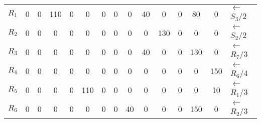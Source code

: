 \documentclass[12pt]{article}
\begin{document}
\begin{enumerate}
\begin{tabular}{|c|c|c|c|c|c|c|c|c|c|c|c|c|c|l}
$R_1$ & 0   & {\color[HTML]{000000} 0}        & {\color[HTML]{000000} 110}      & {\color[HTML]{000000} 0}        & {\color[HTML]{000000} 0}   & {\color[HTML]{000000} 0}   & {\color[HTML]{000000} 0}   & {\color[HTML]{000000} 0}  & {\color[HTML]{000000} 40}  & {\color[HTML]{000000} 0}   & {\color[HTML]{000000} 0}   & {\color[HTML]{FE0000} 80}  & {\color[HTML]{000000} 0}   & ${\leftarrow}$ $S_3$/2 \\ \cline{1-14}
$R_2$ & 0   & {\color[HTML]{000000} 0}        & {\color[HTML]{000000} 0}        & {\color[HTML]{000000} 0}        & {\color[HTML]{000000} 0}   & {\color[HTML]{000000} 0}   & {\color[HTML]{000000} 0}   & {\color[HTML]{000000} 0}  & {\color[HTML]{000000} 0}   & {\color[HTML]{000000} 130} & {\color[HTML]{000000} 0}   & {\color[HTML]{000000} 0}   & {\color[HTML]{000000} 0}   & ${\leftarrow}$ $S_2$/2 \\ \cline{1-14}
$R_3$ & 0   & {\color[HTML]{000000} 0}        & {\color[HTML]{000000} 0}        & {\color[HTML]{000000} 0}        & {\color[HTML]{000000} 0}   & {\color[HTML]{000000} 0}   & {\color[HTML]{000000} 0}   & {\color[HTML]{000000} 0}  & {\color[HTML]{000000} 40}  & {\color[HTML]{000000} 0}   & {\color[HTML]{000000} 0}   & {\color[HTML]{000000} 130} & {\color[HTML]{000000} 0}   & ${\leftarrow}$ $R_7$/3 \\ \cline{1-14}
$R_4$ & 0   & {\color[HTML]{000000} 0}        & {\color[HTML]{000000} 0}        & {\color[HTML]{000000} 0}        & {\color[HTML]{000000} 0}   & {\color[HTML]{000000} 0}   & {\color[HTML]{000000} 0}   & {\color[HTML]{000000} 0}  & {\color[HTML]{000000} 0}   & {\color[HTML]{000000} 0}   & {\color[HTML]{000000} 0}   & {\color[HTML]{000000} 0}   & {\color[HTML]{000000} 150} & ${\leftarrow}$ $R_6$/4 \\ \cline{1-14}
$R_5$ & 0   & {\color[HTML]{000000} 0}        & {\color[HTML]{000000} 0}        & {\color[HTML]{000000} 0}        & {\color[HTML]{000000} 110} & {\color[HTML]{000000} 0}   & {\color[HTML]{000000} 0}   & {\color[HTML]{000000} 0}  & {\color[HTML]{000000} 0}   & {\color[HTML]{000000} 0}   & {\color[HTML]{000000} 0}   & {\color[HTML]{000000} 0}   & {\color[HTML]{000000} 10}  & ${\leftarrow}$ $R_1$/3 \\ \cline{1-14}
$R_6$ & 0   & {\color[HTML]{000000} 0}        & {\color[HTML]{000000} 0}        & {\color[HTML]{000000} 0}        & {\color[HTML]{000000} 0}   & {\color[HTML]{000000} 0}   & {\color[HTML]{000000} 0}   & {\color[HTML]{000000} 40} & {\color[HTML]{000000} 0}   & {\color[HTML]{000000} 0}   & {\color[HTML]{000000} 0}   & {\color[HTML]{000000} 150} & {\color[HTML]{000000} 0}   & ${\leftarrow}$ $R_2$/3 \\ \cline{1-14}

\end{tabular}
\end{enumerate}
\end{document}
